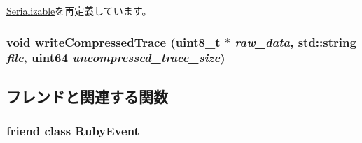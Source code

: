 \hyperlink{classSerializable_af100c4e9feabf3cd918619c88c718387}{Serializable}を再定義しています。\hypertarget{classRubySystem_a158f1a4484dab34bceeee8cb54501ced}{
\subsubsection[{writeCompressedTrace}]{\setlength{\rightskip}{0pt plus 5cm}void writeCompressedTrace (uint8\_\-t $\ast$ {\em raw\_\-data}, \/  std::string {\em file}, \/  {\bf uint64} {\em uncompressed\_\-trace\_\-size})}}
\label{classRubySystem_a158f1a4484dab34bceeee8cb54501ced}


\subsection{フレンドと関連する関数}
\hypertarget{classRubySystem_a384b2b27e44aae348fc2c459a78d4a90}{
\subsubsection[{RubyEvent}]{\setlength{\rightskip}{0pt plus 5cm}friend class {\bf RubyEvent}}}
\label{classRubySystem_a384b2b27e44aae348fc2c459a78d4a90}


